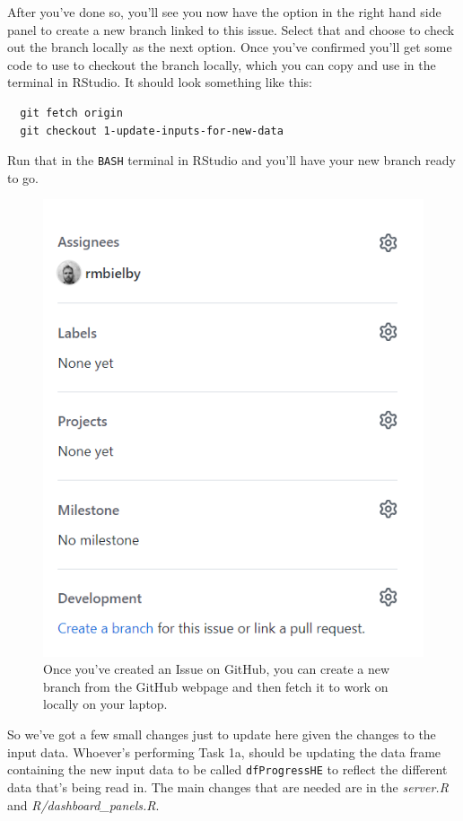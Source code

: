 \documentclass[
  12pt,
]{article}
\begin{document}
After you've done so, you'll see you now have the option in the right
hand side panel to create a new branch linked to this issue. Select that
and choose to check out the branch locally as the next option. Once
you've confirmed you'll get some code to use to checkout the branch
locally, which you can copy and use in the terminal in RStudio. It
should look something like this:

\begin{verbatim}
  git fetch origin
  git checkout 1-update-inputs-for-new-data
\end{verbatim}

Run that in the \texttt{BASH} terminal in RStudio and you'll have your
new branch ready to go.

\begin{figure}

{\centering \includegraphics[width=0.64\linewidth]{images/gitdemo/gitdemo-GitHub-Issues-NewBranch} 

}

\caption{Once you've created an Issue on GitHub, you can create a new branch from the GitHub webpage and then fetch it to work on locally on your laptop.}\label{fig:unnamed-chunk-11}
\end{figure}

So we've got a few small changes just to update here given the changes
to the input data. Whoever's performing Task 1a, should be updating the
data frame containing the new input data to be called
\texttt{dfProgressHE} to reflect the different data that's being read
in. The main changes that are needed are in the \emph{server.R} and
\emph{R/dashboard\_panels.R}.
\end{document}
